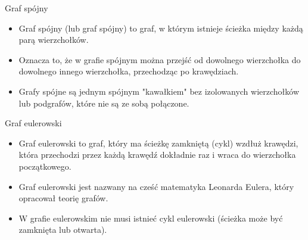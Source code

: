 \documentclass[polish,envcountsect,10pt]{beamer}
\begin{document}
\begin{frame}{Graf spójny}
    \begin{itemize}
        \item Graf spójny (lub graf spójny) to graf, w którym istnieje ścieżka między każdą parą wierzchołków.
        \item Oznacza to, że w grafie spójnym można przejść od dowolnego wierzchołka do dowolnego innego wierzchołka, przechodząc po krawędziach.
        \item Grafy spójne są jednym spójnym "kawałkiem" bez izolowanych wierzchołków lub podgrafów, które nie są ze sobą połączone.
    \end{itemize}
    \begin{center}
    \end{center}
\end{frame}

\begin{frame}{Graf eulerowski}
    \begin{itemize}
        \item Graf eulerowski to graf, który ma ścieżkę zamkniętą (cykl) wzdłuż krawędzi, która przechodzi przez każdą krawędź dokładnie raz i wraca do wierzchołka początkowego.
        \item Graf eulerowski jest nazwany na cześć matematyka Leonarda Eulera, który opracował teorię grafów.
        \item W grafie eulerowskim nie musi istnieć cykl eulerowski (ścieżka może być zamknięta lub otwarta).
    \end{itemize}
    \begin{center}
    \end{center}
\end{frame}
\end{document}
